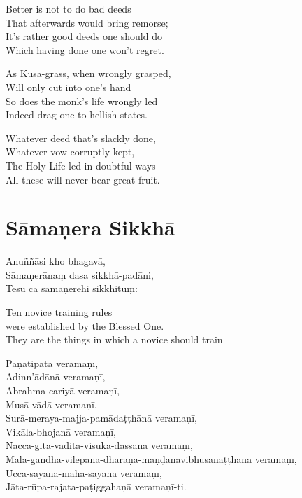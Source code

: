 \begin{english}
  Better is not to do bad deeds\\
  That afterwards would bring remorse;\\
  It's rather good deeds one should do\\
  Which having done one won't regret.

  As Kusa-grass, when wrongly grasped,\\
  Will only cut into one's hand\\
  So does the monk's life wrongly led\\
  Indeed drag one to hellish states.

  Whatever deed that's slackly done,\\
  Whatever vow corruptly kept,\\
  The Holy Life led in doubtful ways ---\\
  All these will never bear great fruit.
\end{english}


\section{Sāmaṇera Sikkhā}


Anuññāsi kho bhagavā,\\
Sāmaṇerānaṃ dasa sikkhā-padāni,\\
Tesu ca sāmaṇerehi sikkhituṃ:\\

\begin{english}
  Ten novice training rules\\
  were established by the Blessed One.\\
  They are the things in which a novice should train
\end{english}

Pāṇātipātā veramaṇī,\\
Adinn'ādānā veramaṇī,\\
Abrahma-cariyā veramaṇī,\\
Musā-vādā veramaṇī,\\
Surā-meraya-majja-pamādaṭṭhānā veramaṇī,\\
Vikāla-bhojanā veramaṇī,\\
Nacca-gīta-vādita-visūka-dassanā veramaṇī,\\
Mālā-gandha-vilepana-dhāraṇa-maṇḍanavibhūsanaṭṭhānā veramaṇī,\\
Uccā-sayana-mahā-sayanā veramaṇī,\\
Jāta-rūpa-rajata-paṭiggahaṇā veramaṇī-ti.

